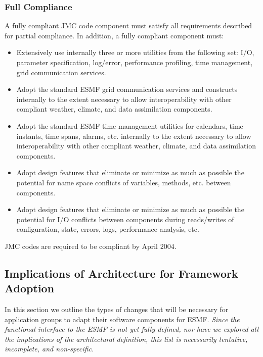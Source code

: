 \subsubsection{Full Compliance}

A fully compliant JMC code component must satisfy all requirements 
described for partial compliance.  In addition, a fully compliant 
component must:

\begin{itemize}
\item Extensively use internally three or more utilities from the following
set:
   I/O, parameter specification, log/error, performance profiling, time
   management, grid communication services.

\item Adopt the standard ESMF grid communication services and constructs
   internally to the extent necessary to allow interoperability with
   other compliant weather, climate, and data assimilation
   components.

\item Adopt the standard ESMF time management utilities for calendars,
time instants, time spans, alarms, etc. internally to the extent
necessary to allow interoperability with other compliant weather,
climate, and data assimilation components.

\item Adopt design features that eliminate or minimize as much as possible
the potential for name space conflicts of variables, methods, etc.
between components.

\item Adopt design features that eliminate or minimize as much as possible
the potential for I/O conflicts between components during reads/writes
of configuration, state, errors, logs, performance analysis, etc.
\end{itemize}

JMC codes are required to be compliant by April 2004.

\subsection{Implications of Architecture for Framework Adoption}

In this section we outline the types of changes that will be necessary for
application groups to adapt their software components for ESMF.  {\it Since the
functional interface to the ESMF is not yet fully defined, nor have we 
explored all the implications of the architectural definition, this list is 
necessarily tentative, incomplete, and non-specific.}

